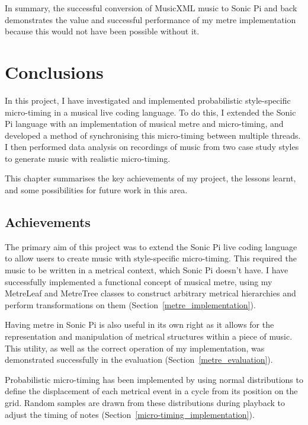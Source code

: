 \documentclass[12pt,twoside,openright]{report}
\begin{document}
In summary, the successful conversion of MusicXML music to Sonic Pi and back
demonstrates the value and successful performance of my metre implementation
because this would not have been possible without it.





\chapter{Conclusions} \label{conclusions}

In this project, I have investigated and implemented probabilistic
style-specific micro-timing in a musical live coding language. To do this, I
extended the Sonic Pi language with an implementation of musical metre and
micro-timing, and developed a method of synchronising this micro-timing between
multiple threads. I then performed data analysis on recordings of music from two
case study styles to generate music with realistic micro-timing.

This chapter summarises the key achievements of my project, the lessons learnt,
and some possibilities for future work in this area.



\section{Achievements} \label{achievements}

The primary aim of this project was to extend the Sonic Pi live coding language
to allow users to create music with style-specific micro-timing. This required
the music to be written in a metrical context, which Sonic Pi doesn't have. I
have successfully implemented a functional concept of musical metre, using my
MetreLeaf and MetreTree classes to construct arbitrary metrical hierarchies and
perform transformations on them (Section~\ref{metre_implementation}).

Having metre in Sonic Pi is also useful in its own right as it allows for the
representation and manipulation of metrical structures within a piece of music.
This utility, as well as the correct operation of my implementation, was
demonstrated successfully in the evaluation (Section~\ref{metre_evaluation}).

Probabilistic micro-timing has been implemented by using normal distributions to
define the displacement of each metrical event in a cycle from its position on the
grid. Random samples are drawn from these distributions during playback to
adjust the timing of notes (Section~\ref{micro-timing_implementation}).
\end{document}
